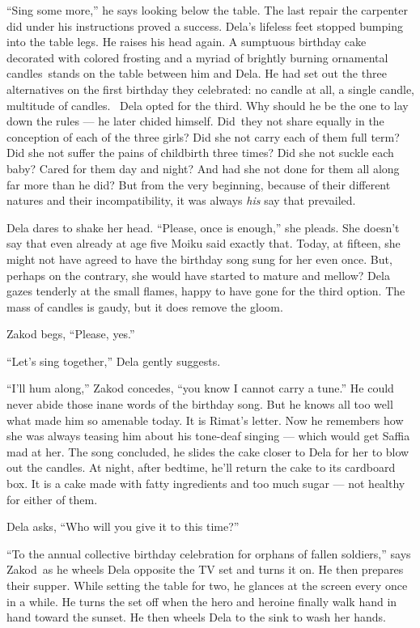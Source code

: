 \documentclass[twoside,11pt]{book}
\begin{document}
``Sing some more,'' he says looking below the table. The last repair the carpenter did under
his instructions proved a success. Dela's lifeless feet stopped bumping into the table legs. He raises his head again.
A sumptuous birthday cake decorated with colored frosting and a myriad of brightly burning ornamental candles~stands on
the table between him and Dela. He had set out the three alternatives on the first birthday they celebrated: no candle
at all, a single candle, multitude of candles.~ Dela opted for the third. Why should he be the one to lay down the
rules --- he later chided himself. Did~they not share equally in the conception of each of the three girls? Did she not
carry each of them full term? Did she not suffer the pains of childbirth three times? Did she not suckle each baby?
Cared for them day and night? And had she not done for them all along far more than he did? But from the very
beginning, because of their different natures and their incompatibility, it was always \textit{his} say that
prevailed.

Dela dares to shake her head. ``Please, once is enough,'' she pleads. She doesn't say that
even already at age five Moiku said exactly that. Today, at fifteen, she might not have agreed to have the birthday
song sung for her even once. But, perhaps on the contrary, she would have started to mature and mellow? Dela gazes
tenderly at the small flames, happy to have gone for the third option. The mass of candles is gaudy, but it does
remove the gloom.

Zakod begs, ``Please, yes.''

``Let's sing together,'' Dela gently suggests.

``I'll hum along,'' Zakod concedes, ``you know I cannot carry a
tune.'' He could never abide those inane words of the birthday song. But he knows all too well what made
him so amenable today. It is Rimat's letter. Now he remembers how she was always teasing him about his tone-deaf
singing --- which would get Saffia mad at her.  The song concluded, he slides the cake closer to Dela for her to blow
out the candles.  At night, after bedtime, he'll return the cake to its cardboard box. It is a cake made with fatty
ingredients and too much sugar --- not healthy for either of them.

Dela asks, ``Who will you give it to this time?''

``To the annual collective birthday celebration for orphans of fallen soldiers,'' says
Zakod~as he wheels Dela opposite the TV set and turns it on. He then prepares their supper. While setting the table for
two, he glances at the screen every once in a while. He turns the set off when the hero and heroine finally walk hand
in hand toward the sunset. He then wheels Dela to the sink to wash her hands.
\end{document}
